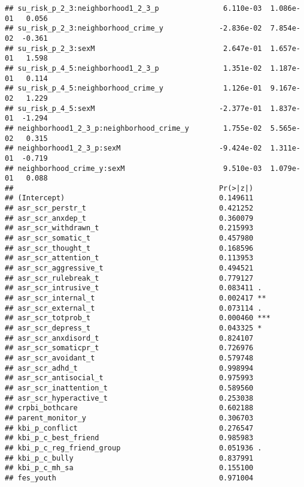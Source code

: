\documentclass[
]{article}
\begin{document}
\begin{verbatim}
## su_risk_p_2_3:neighborhood1_2_3_p               6.110e-03  1.086e-01   0.056
## su_risk_p_2_3:neighborhood_crime_y             -2.836e-02  7.854e-02  -0.361
## su_risk_p_2_3:sexM                              2.647e-01  1.657e-01   1.598
## su_risk_p_4_5:neighborhood1_2_3_p               1.351e-02  1.187e-01   0.114
## su_risk_p_4_5:neighborhood_crime_y              1.126e-01  9.167e-02   1.229
## su_risk_p_4_5:sexM                             -2.377e-01  1.837e-01  -1.294
## neighborhood1_2_3_p:neighborhood_crime_y        1.755e-02  5.565e-02   0.315
## neighborhood1_2_3_p:sexM                       -9.424e-02  1.311e-01  -0.719
## neighborhood_crime_y:sexM                       9.510e-03  1.079e-01   0.088
##                                                Pr(>|z|)    
## (Intercept)                                    0.149611    
## asr_scr_perstr_t                               0.421252    
## asr_scr_anxdep_t                               0.360079    
## asr_scr_withdrawn_t                            0.215993    
## asr_scr_somatic_t                              0.457980    
## asr_scr_thought_t                              0.168596    
## asr_scr_attention_t                            0.113953    
## asr_scr_aggressive_t                           0.494521    
## asr_scr_rulebreak_t                            0.779127    
## asr_scr_intrusive_t                            0.083411 .  
## asr_scr_internal_t                             0.002417 ** 
## asr_scr_external_t                             0.073114 .  
## asr_scr_totprob_t                              0.000460 ***
## asr_scr_depress_t                              0.043325 *  
## asr_scr_anxdisord_t                            0.824107    
## asr_scr_somaticpr_t                            0.726976    
## asr_scr_avoidant_t                             0.579748    
## asr_scr_adhd_t                                 0.998994    
## asr_scr_antisocial_t                           0.975993    
## asr_scr_inattention_t                          0.589560    
## asr_scr_hyperactive_t                          0.253038    
## crpbi_bothcare                                 0.602188    
## parent_monitor_y                               0.306703    
## kbi_p_conflict                                 0.276547    
## kbi_p_c_best_friend                            0.985983    
## kbi_p_c_reg_friend_group                       0.051936 .  
## kbi_p_c_bully                                  0.837991    
## kbi_p_c_mh_sa                                  0.155100    
## fes_youth                                      0.971004    

\end{verbatim}
\end{document}
